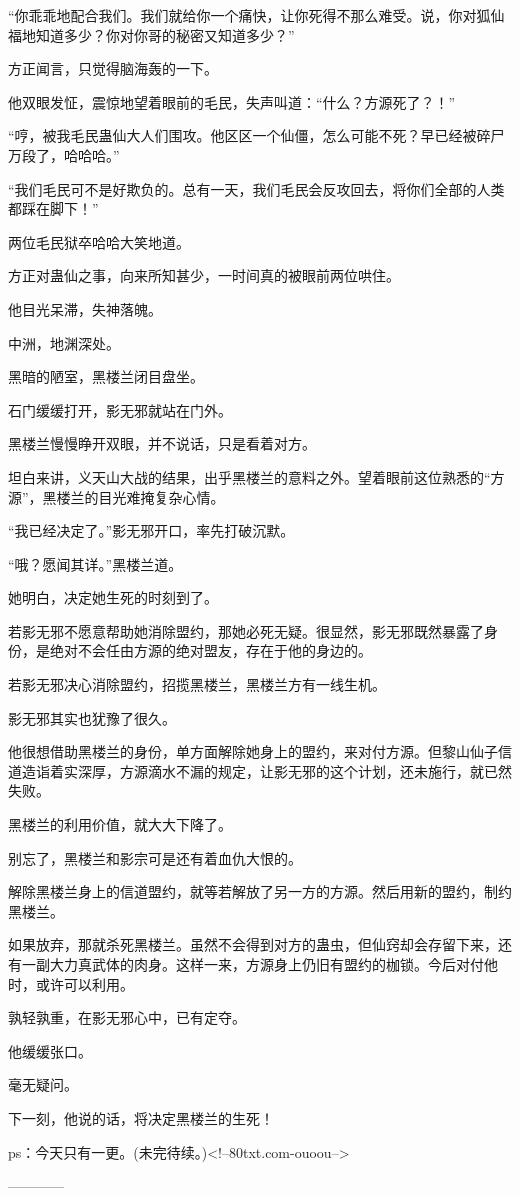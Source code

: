 \begin{this_body}
“你乖乖地配合我们。我们就给你一个痛快，让你死得不那么难受。说，你对狐仙福地知道多少？你对你哥的秘密又知道多少？”

方正闻言，只觉得脑海轰的一下。

他双眼发怔，震惊地望着眼前的毛民，失声叫道：“什么？方源死了？！”

“哼，被我毛民蛊仙大人们围攻。他区区一个仙僵，怎么可能不死？早已经被碎尸万段了，哈哈哈。”

“我们毛民可不是好欺负的。总有一天，我们毛民会反攻回去，将你们全部的人类都踩在脚下！”

两位毛民狱卒哈哈大笑地道。

方正对蛊仙之事，向来所知甚少，一时间真的被眼前两位哄住。

他目光呆滞，失神落魄。

中洲，地渊深处。

黑暗的陋室，黑楼兰闭目盘坐。

石门缓缓打开，影无邪就站在门外。

黑楼兰慢慢睁开双眼，并不说话，只是看着对方。

坦白来讲，义天山大战的结果，出乎黑楼兰的意料之外。望着眼前这位熟悉的“方源”，黑楼兰的目光难掩复杂心情。

“我已经决定了。”影无邪开口，率先打破沉默。

“哦？愿闻其详。”黑楼兰道。

她明白，决定她生死的时刻到了。

若影无邪不愿意帮助她消除盟约，那她必死无疑。很显然，影无邪既然暴露了身份，是绝对不会任由方源的绝对盟友，存在于他的身边的。

若影无邪决心消除盟约，招揽黑楼兰，黑楼兰方有一线生机。

影无邪其实也犹豫了很久。

他很想借助黑楼兰的身份，单方面解除她身上的盟约，来对付方源。但黎山仙子信道造诣着实深厚，方源滴水不漏的规定，让影无邪的这个计划，还未施行，就已然失败。

黑楼兰的利用价值，就大大下降了。

别忘了，黑楼兰和影宗可是还有着血仇大恨的。

解除黑楼兰身上的信道盟约，就等若解放了另一方的方源。然后用新的盟约，制约黑楼兰。

如果放弃，那就杀死黑楼兰。虽然不会得到对方的蛊虫，但仙窍却会存留下来，还有一副大力真武体的肉身。这样一来，方源身上仍旧有盟约的枷锁。今后对付他时，或许可以利用。

孰轻孰重，在影无邪心中，已有定夺。

他缓缓张口。

毫无疑问。

下一刻，他说的话，将决定黑楼兰的生死！

ps：今天只有一更。(未完待续。)<!--80txt.com-ouoou-->

------------

\end{this_body}


